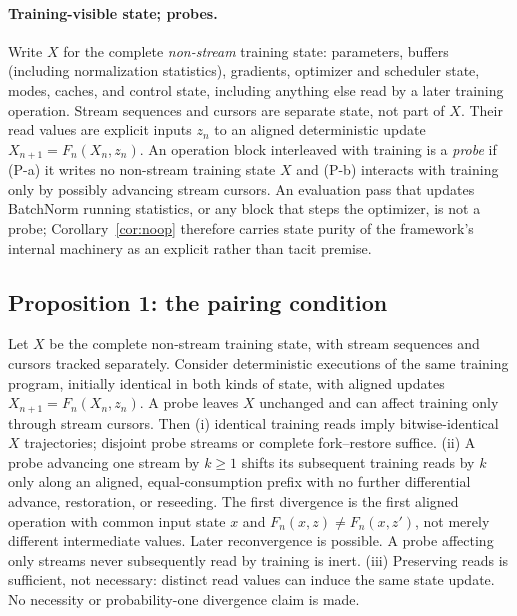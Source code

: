 \paragraph{Training-visible state; probes.}
Write $X$ for the complete \emph{non-stream} training state: parameters,
buffers (including normalization statistics), gradients, optimizer and
scheduler state, modes, caches, and control state, including anything else
read by a later training operation. Stream sequences and cursors are separate
state, not part of $X$. Their read values are explicit inputs $z_n$ to an
aligned deterministic update $X_{n+1}=F_n(X_n,z_n)$. An
operation block interleaved with training is a \emph{probe} if (P-a) it
writes no non-stream training state $X$ and (P-b) interacts with training only
by possibly advancing stream cursors. An evaluation pass that updates
BatchNorm running statistics, or any block that steps the optimizer, is
not a probe; Corollary~\ref{cor:noop} therefore carries state purity of
the framework's internal machinery as an explicit rather than tacit
premise.

\subsection{Proposition 1: the pairing condition}

\begin{propositionx}

Let $X$ be the complete non-stream training state, with stream sequences
and cursors tracked separately. Consider deterministic executions of the
same training program, initially identical in both kinds of state, with
aligned updates $X_{n+1}=F_n(X_n,z_n)$. A probe leaves $X$ unchanged and can
affect training only through stream cursors. Then (i) identical training
reads imply bitwise-identical $X$ trajectories; disjoint probe streams or
complete fork--restore suffice. (ii) A probe advancing one stream by
$k\ge1$ shifts its subsequent training reads by $k$ only along an aligned,
equal-consumption prefix with no further differential advance, restoration,
or reseeding.
The first divergence is the first aligned operation with common input
state $x$ and $F_n(x,z)\ne F_n(x,z')$, not merely different intermediate
values. Later reconvergence is possible. A probe affecting only streams
never subsequently read by training is inert. (iii) Preserving reads is
sufficient, not necessary: distinct read values can induce the same state
update. No necessity or probability-one divergence claim is made.
\end{propositionx}


